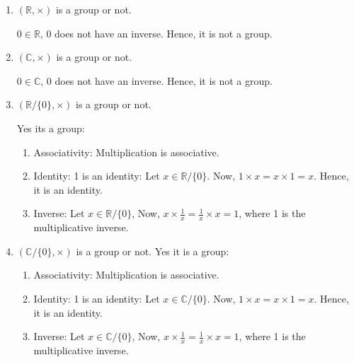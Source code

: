 \documentclass[12pt, oneside]{book}
\begin{document}
\begin{enumerate}
    \item \( \left(\mathbb{R}, \times \right)\) is a group or not.
    
    \(0 \in \mathbb{R}\), \(0\) does not have an inverse. Hence, it is not a group.

    \item \(\left(\mathbb{C}, \times\right)\) is a group or not.
    
    \(0 \in \mathbb{C}\), \(0\) does not have an inverse. Hence, it is not a group.
    
    \item \(\left(\mathbb{R}/\{0\}, \times \right)\) is a group or not.
    
    Yes its a group:
    \begin{enumerate}
        \item Associativity: Multiplication is associative.
        \item Identity: 1 is an identity:
        Let \(x \in \mathbb{R}/\{0\} \). Now, \(1 \times x = x \times 1 = x\). Hence, it is an identity.
        \item Inverse: Let \(x \in \mathbb{R}/\{0\} \), Now, \(x \times \frac{1}{x} = \frac{1}{x} \times x = 1\), where 1 is the multiplicative inverse.
    \end{enumerate}

    \item \(\left(\mathbb{C}/\{0\}, \times \right)\) is a group or not.
    Yes it is a group:
    \begin{enumerate}
        \item Associativity: Multiplication is associative.
        \item Identity: 1 is an identity:
        Let \(x \in \mathbb{C}/\{0\} \). Now, \(1 \times x = x \times 1 = x\). Hence, it is an identity.
        \item Inverse: Let \(x \in \mathbb{C}/\{0\} \), Now, \(x \times \frac{1}{x} = \frac{1}{x} \times x = 1\), where 1 is the multiplicative inverse.
    \end{enumerate}

\end{enumerate}
\end{document}
